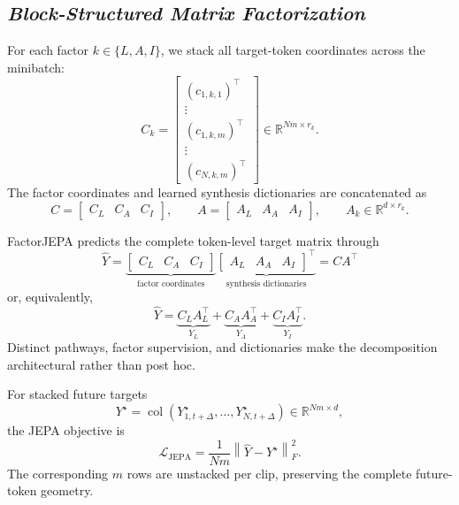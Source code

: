 \subsection{\textbf{\emph{Block-Structured Matrix Factorization}}}

For each factor $k\in\{L,A,I\}$, we stack all target-token coordinates across
the minibatch:
\[
C_k
=
\begin{bmatrix}
(c_{1,k,1})^\top\\[-1mm]
\vdots\\
(c_{1,k,m})^\top\\
\vdots\\
(c_{N,k,m})^\top
\end{bmatrix}
\in\mathbb{R}^{Nm\times r_k}.
\]
The factor coordinates and learned synthesis dictionaries are concatenated as
\[
C=
\begin{bmatrix}
C_L & C_A & C_I
\end{bmatrix},
\qquad
A=
\begin{bmatrix}
A_L & A_A & A_I
\end{bmatrix},
\qquad
A_k\in\mathbb{R}^{d\times r_k}.
\]

FactorJEPA predicts the complete token-level target matrix through
\[
\boxed{
\widehat Y
=
\underbrace{
\begin{bmatrix}
C_L & C_A & C_I
\end{bmatrix}
}_{\text{factor coordinates}}
\underbrace{
\begin{bmatrix}
A_L & A_A & A_I
\end{bmatrix}^{\!\top}
}_{\text{synthesis dictionaries}}
=
CA^\top
}
\]
or, equivalently,
\[
\widehat Y
=
\underbrace{C_LA_L^\top}_{Y_L}
+
\underbrace{C_AA_A^\top}_{Y_A}
+
\underbrace{C_IA_I^\top}_{Y_I}.
\]
Distinct pathways, factor supervision, and dictionaries make the decomposition
architectural rather than post hoc.

For stacked future targets
\[
Y^\star
=
\operatorname{col}
\left(
Y_{1,t+\Delta}^\star,\ldots,Y_{N,t+\Delta}^\star
\right)
\in\mathbb{R}^{Nm\times d},
\]
the JEPA objective is
\[
\mathcal L_{\mathrm{JEPA}}
=
\frac{1}{Nm}
\left\|
\widehat Y-Y^\star
\right\|_F^2.
\]
The corresponding $m$ rows are unstacked per clip, preserving the complete
future-token geometry.















